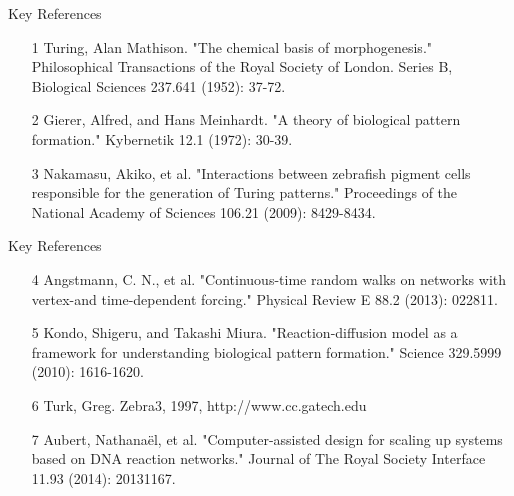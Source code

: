 \documentclass[pdf]{beamer}
\begin{document}
\begin{frame}{Key References}
\begin{itemize}
\item [1]Turing, Alan Mathison. "The chemical basis of morphogenesis." Philosophical Transactions of the Royal Society of London. Series B, Biological Sciences 237.641 (1952): 37-72.
\item [2]Gierer, Alfred, and Hans Meinhardt. "A theory of biological pattern formation." Kybernetik 12.1 (1972): 30-39.
\item [3]Nakamasu, Akiko, et al. "Interactions between zebrafish pigment cells responsible for the generation of Turing patterns." Proceedings of the National Academy of Sciences 106.21 (2009): 8429-8434.
\end{itemize}
\end{frame}
\begin{frame}{Key References}
\begin{itemize}
\item [4] Angstmann, C. N., et al. "Continuous-time random walks on networks with vertex-and time-dependent forcing." Physical Review E 88.2 (2013): 022811.
\item [5] Kondo, Shigeru, and Takashi Miura. "Reaction-diffusion model as a framework for understanding biological pattern formation." Science 329.5999 (2010): 1616-1620.
\item [6] Turk, Greg. Zebra3, 1997, http://www.cc.gatech.edu
\item [7] Aubert, Nathanaël, et al. "Computer-assisted design for scaling up systems based on DNA reaction networks." Journal of The Royal Society Interface 11.93 (2014): 20131167.
\end{itemize}
\end{frame}
\end{document}
